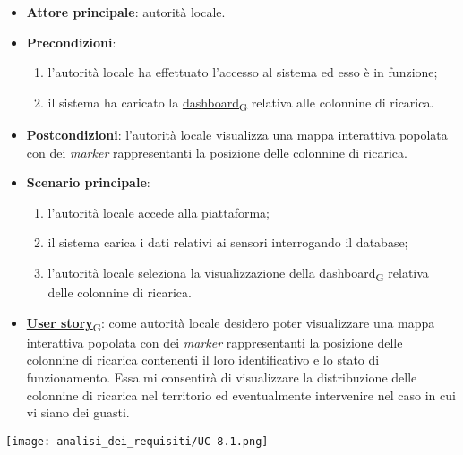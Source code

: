 \begin{itemize}
	\item \textbf{Attore principale}: autorità locale.
	\item \textbf{Precondizioni}:
	      \begin{enumerate}
		      \item l'autorità locale ha effettuato l'accesso al sistema ed esso è in funzione;
		      \item il sistema ha caricato la \href{https://7last.github.io/docs/pb/documentazione-interna/glossario\#dashboard}{dashboard\textsubscript{G}} relativa alle colonnine di ricarica.
	      \end{enumerate}
	\item \textbf{Postcondizioni}: l'autorità locale visualizza una mappa interattiva popolata con dei \textit{marker} rappresentanti la posizione delle colonnine di ricarica.
	\item \textbf{Scenario principale}:
	      \begin{enumerate}
		      \item l'autorità locale accede alla piattaforma;
		      \item il sistema carica i dati relativi ai sensori interrogando il database;
		      \item l'autorità locale seleziona la visualizzazione della \href{https://7last.github.io/docs/pb/documentazione-interna/glossario\#dashboard}{dashboard\textsubscript{G}} relativa delle colonnine di ricarica.
	      \end{enumerate}
	\item \href{https://7last.github.io/docs/pb/documentazione-interna/glossario\#user-story}{\textbf{User story}\textsubscript{G}}:
	      come autorità locale desidero poter visualizzare una mappa interattiva popolata con dei \textit{marker} rappresentanti la posizione delle colonnine di ricarica
	      contenenti il loro identificativo e lo stato di funzionamento. Essa mi consentirà di visualizzare la distribuzione delle colonnine di ricarica nel territorio
	      ed eventualmente intervenire nel caso in cui vi siano dei guasti.
\end{itemize}
\begin{center}
	\texttt{[image: analisi\_dei\_requisiti/UC-8.1.png]}
\end{center}


